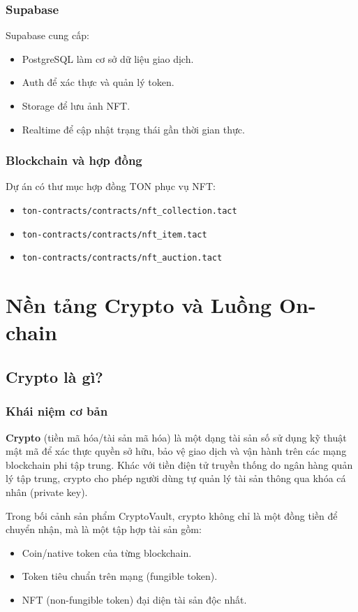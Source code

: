 \documentclass[a4paper,12pt]{report}
\begin{document}
\subsection{Supabase}
Supabase cung cấp:
\begin{itemize}
    \item PostgreSQL làm cơ sở dữ liệu giao dịch.
    \item Auth để xác thực và quản lý token.
    \item Storage để lưu ảnh NFT.
    \item Realtime để cập nhật trạng thái gần thời gian thực.
\end{itemize}

\subsection{Blockchain và hợp đồng}
Dự án có thư mục hợp đồng TON phục vụ NFT:
\begin{itemize}
    \item \texttt{ton-contracts/contracts/nft\_collection.tact}
    \item \texttt{ton-contracts/contracts/nft\_item.tact}
    \item \texttt{ton-contracts/contracts/nft\_auction.tact}
\end{itemize}



\chapter{Nền tảng Crypto và Luồng On-chain}

\section{Crypto là gì?}
\subsection{Khái niệm cơ bản}
\textbf{Crypto} (tiền mã hóa/tài sản mã hóa) là một dạng tài sản số sử dụng kỹ thuật mật mã để xác thực quyền sở hữu, bảo vệ giao dịch và vận hành trên các mạng blockchain phi tập trung. Khác với tiền điện tử truyền thống do ngân hàng quản lý tập trung, crypto cho phép người dùng tự quản lý tài sản thông qua khóa cá nhân (private key).

Trong bối cảnh sản phẩm CryptoVault, crypto không chỉ là một đồng tiền để chuyển nhận, mà là một tập hợp tài sản gồm:
\begin{itemize}
    \item Coin/native token của từng blockchain.
    \item Token tiêu chuẩn trên mạng (fungible token).
    \item NFT (non-fungible token) đại diện tài sản độc nhất.
\end{itemize}
\end{document}

